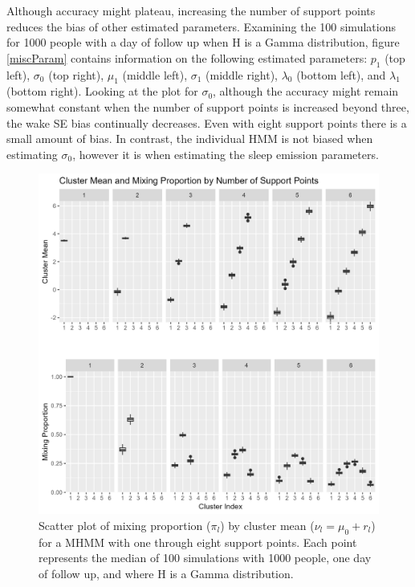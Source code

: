\documentclass{article}
\begin{document}
Although accuracy might plateau, increasing the number of support points reduces the bias of other estimated parameters. Examining the 100 simulations for 1000 people with a day of follow up when H is a Gamma distribution, figure \ref{miscParam} contains information on the following estimated parameters: $p_1$ (top left), $\sigma_0$ (top right), $\mu_1$ (middle left), $\sigma_1$ (middle right), $\lambda_0$ (bottom left), and $\lambda_1$ (bottom right). Looking at the plot for $\sigma_0$, although the accuracy might remain somewhat constant when the number of support points is increased beyond three, the wake SE bias continually decreases. Even with eight support points there is a small amount of bias. In contrast, the individual HMM is not biased when estimating $\sigma_0$, however it is when estimating the sleep emission parameters. 

\begin{figure}
    \includegraphics[scale=.48]{Support/clustmeanmix.png}
    \centering
    \caption{Scatter plot of mixing proportion ($\pi_l$) by cluster mean ($\nu_l = \mu_0+r_l$) for a MHMM with one through eight support points. Each point represents the median of 100 simulations with 1000 people, one day of follow up, and where H is a Gamma distribution.}
    \label{CMM}
\end{figure}
\end{document}
